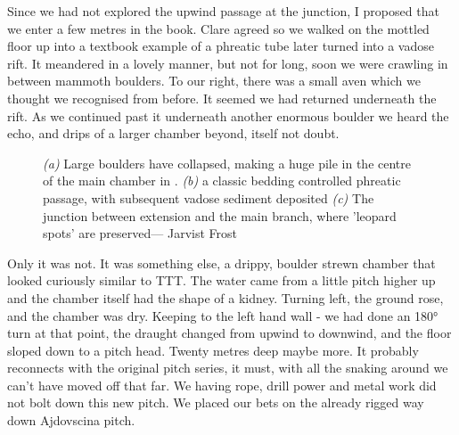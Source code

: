Since we had not explored the upwind passage at the junction, I proposed that we enter a few metres in the book. Clare agreed so we walked on the mottled floor up into a textbook example of a phreatic tube later turned into a vadose rift. It meandered in a lovely manner, but not for long, soon we were crawling in between mammoth boulders. To our right, there was a small aven which we thought we recognised from before. It seemed we had returned underneath the  rift. As we continued past it underneath another enormous boulder we heard the echo, and drips of a larger chamber beyond,  itself not doubt.





\begin{figure}[t!]
\checkoddpage \ifoddpage \forcerectofloat \else \forceversofloat \fi
\centering
    \begin{subfigure}[t]{0.353\textwidth}
        \centering
        
        \caption{} \label{traverse over buckwheat}
    \end{subfigure}
        \hfill
\begin{subfigure}[t]{0.63\textwidth}
\centering
{}
 \caption{}\label{passage in Deja VU}
\end{subfigure}
    \vspace{0cm}
    \begin{subfigure}[t]{\textwidth}
    \centering
       
        \caption{} \label{Deja vu}
    \end{subfigure}
    \caption{
    \textit{(a)} Large boulders have collapsed, making a huge pile in the centre of the main chamber in \protect{}.  
     \textit{(b)} \protect{} a classic bedding controlled phreatic passage, with subsequent vadose sediment deposited
     \textit{(c)} The junction between  \protect{} extension and the main \protect{} branch, where 'leopard spots' are preserved--- Jarvist Frost }
\end{figure}


Only it was not. It was something else, a drippy, boulder strewn chamber that looked curiously similar to TTT. The water came from a little pitch higher up and the chamber itself had the shape of a kidney. Turning left, the ground rose, and the chamber was dry. Keeping to the left hand wall - we had done an 180° turn at that point, the draught changed from upwind to downwind, and the floor sloped down to a pitch head. Twenty metres deep maybe more. It probably reconnects with the original pitch series, it must, with all the snaking around we can’t have moved off that far. We having rope, drill power and metal work did not bolt down this new pitch. We placed our bets on the already rigged way down Ajdovscina pitch. 

